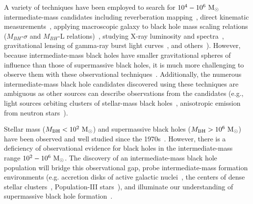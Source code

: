 \documentclass[%
 nofootinbib,
 amsmath,amssymb,
 aps,
 twocolumn,
 superscriptaddress
]{revtex4-2}
\newcommand{\mathcmd}[1]{{\sc \relax\ifmmode#1\else $#1$\fi}\xspace}
\newcommand{\msun}{\mathcmd{\text{M}_\odot}}
\begin{document}
A variety of techniques have been employed to search for $10^{4} - 10^{6}\ \msun$ intermediate-mass candidates including reverberation mapping~\cite{Peterson:2014:SSRv}, direct kinematic measurements~\cite{Schodel:2002:Natur, Kiziltan:2017:Natur}, applying macroscopic galaxy to black hole mass scaling relations ($M_{BH}$-$\sigma$ and $M_{BH}$-L relations)~\cite{Graham:2013:ApJ, Wevers:2017:MNRAS}, studying  X-ray luminosity and spectra~\cite{Greene:2004:ApJ, Lin:2020:ApJL}, gravitational lensing of gamma-ray burst light curves~\cite{paynter_evidence_2021}, and others~\cite{Greene:2020:ARA&A, Koliopanos:2017:mbhe, Mezcua:2017:IJMPD}). However, because intermediate-mass black holes have smaller gravitational spheres of influence than those of supermassive black holes, it is much more challenging to observe them with these observational techniques~\cite{Mezcua:2017:IJMPD}. Additionally, the numerous intermediate-mass black hole candidates discovered using these techniques are ambiguous as other sources can describe observations from the candidates (e.g., light sources orbiting clusters of stellar-mass black holes~\cite{Ridolfi:2016:MNRAS, Freire:2017:MNRAS}, anisotropic emission from neutron stars~\cite{Israel:2017:MNRAS, RodriguezCastillo:2020:ApJ}).

Stellar mass ($M_\text{BH} < 10^{2} \ \msun$) and supermassive black holes ($M_\text{BH} > 10^{6} \ \msun$) have been observed and well studied since the 1970s~\cite{Webster:1972:Natur, Balick:1974:ApJ, Ghez:1998:ApJ, Genzel:2010:RvMP, Abbott:2019:PhRvX, EventHorizonTelescopeCollaboration:2019:ApJL, Abbott:2020:arXiv}. However, there is a deficiency of observational evidence for black holes in the intermediate-mass range $10^{2} - 10^{6}\ \msun$. The discovery of an intermediate-mass black hole population will bridge this observational gap, probe intermediate-mass formation environments (e.g. accretion disks of active galactic nuclei~\cite{Tagawa:2021:ApJ, Li:2021:arXiv, Samsing:2020:arXiv, Tagawa:2020:ApJ, Ishibashi:2020:A&A, Grobner:2020:A&A, Yang:2019:PhRvL, McKernan:2019:ApJL, Yang:2019:ApJ, McKernan:2018:ApJ, Bellovary:2016:ApJL, McKernan:2014:MNRAS, McKernan:2012:MNRAS}, the centers of dense stellar clusters~\cite{Banerjee:2021:MNRASa, Zevin:2021:ApJ,Mapelli:2021:arXiv,Weatherford:2021:ApJL, Bouffanais:2021:arXiv, Ballone:2021:MNRAS, Kumamoto:2021:arXiv, Banerjee:2021:MNRASb, Martinez:2020:ApJ, Romero-Shaw:2020:ApJL, Anagnostou:2020:PASA}, Population-III stars~\cite{Toubiana:2021:PhRvL, Farrell:2021:MNRAS, Safarzadeh:2020:ApJL, Liu:2020:MNRAS, Inayoshi:2017:MNRAS}), and illuminate our understanding of supermassive black hole formation~\cite{Askar:2021:MNRAS, ArcaSedda:2019:arXiv, Amaro-Seoane:2007:CQGra, Gurkan:2006:ApJL}. 
\end{document}
